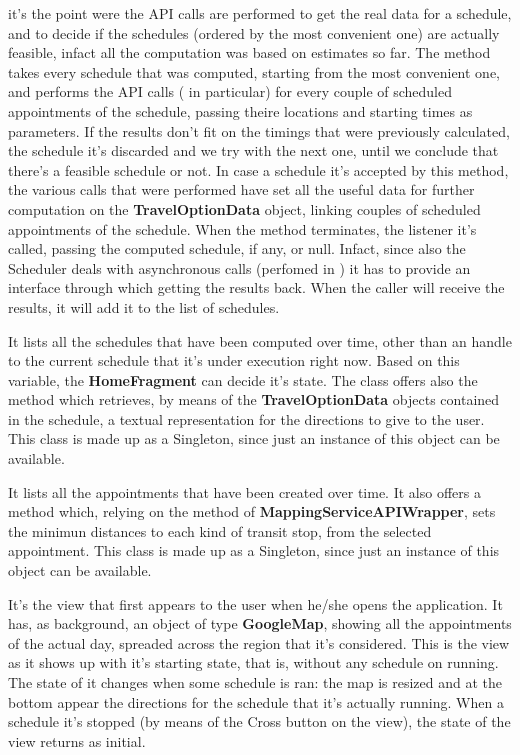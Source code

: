 \label{method:getBestScheduleAsync}  it's the point were the API calls are performed to get the real data for a schedule, and to decide if the schedules (ordered by the most convenient one) are actually feasible, infact all the computation was based on estimates so far.
The method takes every schedule that was computed, starting from the most convenient one, and performs the API calls ( in particular) for every couple of scheduled appointments of the schedule, passing theire locations and starting times as parameters. If the results don't fit on the timings that were previously calculated, the schedule it's discarded and we try with the next one, until we conclude that there's a feasible schedule or not.
In case a schedule it's accepted by this method, the various calls that were performed have set all the useful data for further computation on the \textbf{TravelOptionData} object, linking couples of scheduled appointments of the schedule.
When the method terminates, the listener it's called, passing the computed schedule, if any, or null. Infact, since also the Scheduler deals with asynchronous calls (perfomed in ) it has to provide an interface through which getting the results back.
When the caller will receive the results, it will add it to the list of schedules.

It lists all the schedules that have been computed over time, other than an handle to the current schedule that it's under execution right now. Based on this variable, the \textbf{HomeFragment} can decide it's state. The class offers also the method  which retrieves, by means of the \textbf{TravelOptionData} objects contained in the schedule, a textual representation for the directions to give to the user.
This class is made up as a Singleton, since just an instance of this object can be available.

It lists all the appointments that have been created over time. It also offers a method which, relying on the  method of \textbf{MappingServiceAPIWrapper}, sets the minimun distances to each kind of transit stop, from the selected appointment.
This class is made up as a Singleton, since just an instance of this object can be available.

It's the view that first appears to the user when he/she opens the application. It has, as background, an object of type \textbf{GoogleMap}, showing all the appointments of the actual day, spreaded across the region that it's considered. This is the view as it shows up with it's starting state, that is, without any schedule on running. The state of it changes when some schedule is ran: the map is resized and at the bottom appear the directions for the schedule that it's actually running. When a schedule it's stopped (by means of the Cross button on the view), the state of the view returns as initial.

